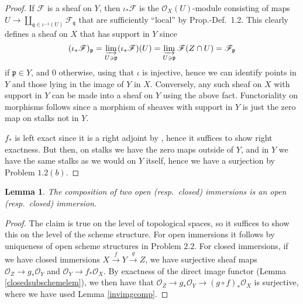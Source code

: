 \documentclass[12pt,letterpaper]{article}
\newtheorem{lemma}{Lemma}[section]
\theoremstyle{definition}
\theoremstyle{remark}
\numberwithin{equation}{section}
\numberwithin{figure}{problem}
\newcommand{\FF}{\mathscr{F}}
\newcommand{\OO}{\mathcal{O}}
\begin{document}
\begin{proof}
  If $\FF$ is a sheaf on $Y$, then $\iota_*\FF$ is the $\OO_X(U)$-module consisting of maps $U \to \coprod_{\mathfrak{q} \in \iota^{-1}(U)} \FF_\mathfrak{q}$ that are sufficiently ``local'' by Prop.-Def.~1.2. This clearly defines a sheaf on $X$ that has support in $Y$ since
  \begin{equation*}
    (\iota_*\FF)_\mathfrak{p} = \varinjlim_{U \ni \mathfrak{p}} (\iota_*\FF)(U) = \varinjlim_{U \ni \mathfrak{p}} \FF(Z \cap U) = \FF_\mathfrak{p}
  \end{equation*}
  if $\mathfrak{p} \in Y$, and $0$ otherwise, using that $\iota$ is injective, hence we can identify points in $Y$ and those lying in the image of $Y$ in $X$. Conversely, any such sheaf on $X$ with support in $Y$ can be made into a sheaf on $Y$ using the above fact. Functoriality on morphisms follows since a morphism of sheaves with support in $Y$ is just the zero map on stalks not in $Y$.
  \par $f_*$ is left exact since it is a right adjoint by \cite[Thm.~2.6.1]{Wei94}, hence it suffices to show right exactness. But then, on stalks we have the zero maps outside of $Y$, and in $Y$ we have the same stalks as we would on $Y$ itself, hence we have a surjection by Problem $1.2(b)$.
\end{proof}
\begin{lemma}\label{openclosedimmcomp}
  The composition of two open (resp.~closed) immersions is an open (resp.~closed) immersion.
\end{lemma}
\begin{proof}
  The claim is true on the level of topological spaces, so it suffices to show this on the level of the scheme structure. For open immersions it follows by uniqueness of open scheme structures in Problem $2.2$. For closed immersions, if we have closed immersions $X \overset{f}{\to} Y \overset{g}{\to} Z$, we have surjective sheaf maps $\OO_Z \to g_*\OO_Y$ and $\OO_Y \to f_*\OO_X$. By exactness of the direct image functor (Lemma \ref{closedsubschemelem}), we then have that $\OO_Z \to g_*\OO_Y \to (g \circ f)_*\OO_X$ is surjective, where we have used Lemma \ref{invimgcomp}.
\end{proof}
\end{document}
